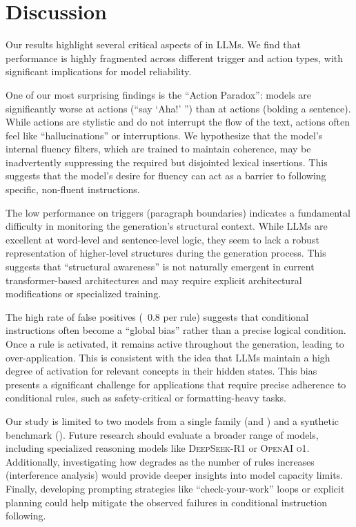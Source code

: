 \section{Discussion}
\label{sec:discussion}

Our results highlight several critical aspects of \ifcapacity in LLMs. We find that performance is highly fragmented across different trigger and action types, with significant implications for model reliability.

One of our most surprising findings is the ``Action Paradox'': models are significantly worse at \lexical actions (\eg ``say `Aha!' '') than at \formatting actions (\eg bolding a sentence). While \formatting actions are stylistic and do not interrupt the flow of the text, \lexical actions often feel like ``hallucinations'' or interruptions. We hypothesize that the model's internal fluency filters, which are trained to maintain coherence, may be inadvertently suppressing the required but disjointed lexical insertions. This suggests that the model's desire for fluency can act as a barrier to following specific, non-fluent instructions.

The low performance on \structural triggers (\eg paragraph boundaries) indicates a fundamental difficulty in monitoring the generation's structural context. While LLMs are excellent at word-level and sentence-level logic, they seem to lack a robust representation of higher-level structures during the generation process. This suggests that ``structural awareness'' is not naturally emergent in current transformer-based architectures and may require explicit architectural modifications or specialized training.

The high rate of false positives (~0.8 per rule) suggests that conditional instructions often become a ``global bias'' rather than a precise logical condition. Once a rule is activated, it remains active throughout the generation, leading to over-application. This is consistent with the idea that LLMs maintain a high degree of activation for relevant concepts in their hidden states. This bias presents a significant challenge for applications that require precise adherence to conditional rules, such as safety-critical or formatting-heavy tasks.

Our study is limited to two models from a single family (\gptlarge and \gptmini) and a synthetic benchmark (\benchmark). Future research should evaluate a broader range of models, including specialized reasoning models like \textsc{DeepSeek-R1} or \textsc{OpenAI o1}. Additionally, investigating how \ifcapacity degrades as the number of rules increases (interference analysis) would provide deeper insights into model capacity limits. Finally, developing prompting strategies like ``check-your-work'' loops or explicit planning could help mitigate the observed failures in conditional instruction following.
